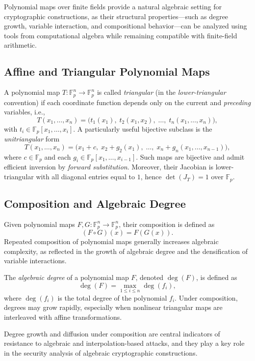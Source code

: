 ﻿\documentclass[english]{aucmcs}
\newcommand{\Fp}{\mathbb{F}_p}
\begin{document}
Polynomial maps over finite fields provide a natural algebraic setting for cryptographic constructions, as their structural properties---such as degree growth, variable interaction, and compositional behavior---can be analyzed using tools from computational algebra while remaining compatible with finite-field arithmetic.

\subsection{Affine and Triangular Polynomial Maps}

A polynomial map $T : \Fp^n \to \Fp^n$ is called \emph{triangular} (in the
\emph{lower-triangular} convention) if each coordinate function depends
only on the current and \emph{preceding} variables, i.e.,
\[
T(x_1,\ldots,x_n) =
\bigl(
t_1(x_1),\;
t_2(x_1,x_2),\;
\ldots,\;
t_n(x_1,\ldots,x_n)
\bigr),
\]
with $t_i \in \Fp[x_1,\ldots,x_i]$. A particularly useful bijective subclass
is the \emph{unitriangular} form
\[
T(x_1,\ldots,x_n)=\bigl(x_1+c,\; x_2+g_2(x_1),\; \ldots,\; x_n+g_n(x_1,\ldots,x_{n-1})\bigr),
\]
where $c\in \Fp$ and each $g_i \in \Fp[x_1,\ldots,x_{i-1}]$. Such maps are
bijective and admit efficient inversion by \emph{forward substitution}.
Moreover, their Jacobian is lower-triangular with all diagonal entries equal
to $1$, hence $\det(J_T)=1$ over $\Fp$.


\subsection{Composition and Algebraic Degree}

Given polynomial maps $F, G : \Fp^n \to \Fp^n$, their composition is defined as
\[
(F \circ G)(x) = F(G(x)).
\]
Repeated composition of polynomial maps generally increases algebraic complexity, as reflected in the growth of algebraic degree and the densification of variable interactions.

The \emph{algebraic degree} of a polynomial map $F$, denoted $\deg(F)$, is defined as
\[
\deg(F) = \max_{1 \leq i \leq n} \deg(f_i),
\]
where $\deg(f_i)$ is the total degree of the polynomial $f_i$. Under composition, degrees may grow rapidly, especially when nonlinear triangular maps are interleaved with affine transformations.

Degree growth and diffusion under composition are central indicators of resistance to algebraic and interpolation-based attacks, and they play a key role in the security analysis of algebraic cryptographic constructions.
\end{document}
